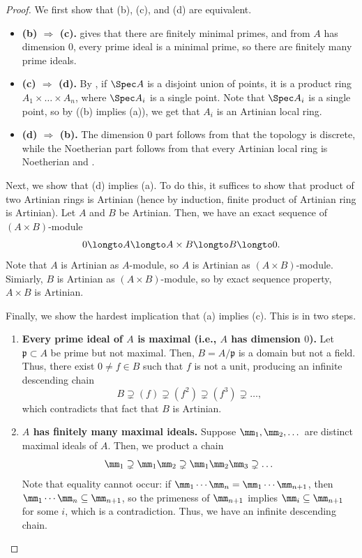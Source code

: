 \begin{proof}
We first show that (b), (c), and (d) are equivalent.
\begin{itemize}
\item \textbf{(b) $\Rightarrow$ (c).}  gives that 
there are finitely minimal primes,
and from $A$ has dimension $0$, 
every prime ideal is a minimal prime,
so there are finitely many prime ideals.
\item \textbf{(c) $\Rightarrow$ (d).} By
, if $\Spec A$
is a disjoint union of points, it is a product ring
$A_1\times\dots\times A_n$,
where $\Spec A_i$ is a single point. 
Note that $\Spec A_i$ is a single point, so by 
((b) implies (a)), we get that $A_i$ is an Artinian 
local ring.
\item \textbf{(d) $\Rightarrow$ (b).}
The dimension $0$ part follows from 
that the topology is discrete,
while the Noetherian part follows from 
 that every Artinian local ring 
is Noetherian and .
\end{itemize}

Next, we show that (d) implies (a).
To do this, it suffices to show that product
of two Artinian rings is Artinian
(hence by induction, finite product of Artinian ring 
is Artinian).
Let $A$ and $B$ be Artinian. Then, we have an exact
sequence of $(A\times B)$-module
$$0\longto A\longto A\times B\longto B\longto 0.$$
Note that $A$ is Artinian as
$A$-module, so $A$ is Artinian as $(A\times B)$-module.
Simiarly, $B$ is Artinian as $(A\times B)$-module,
so by exact sequence property, 
$A\times B$ is Artinian.

Finally, we show the hardest implication that (a) implies (c).
This is in two steps.
\begin{enumerate}
\item \textbf{Every prime ideal of $A$ is maximal
(i.e., $A$ has dimension $0$).}
Let $\mathfrak p\subset A$ be prime but not maximal.
Then, $B=A/\mathfrak p$ is a domain but not a field.
Thus, there exist $0\neq f\in B$
such that $f$ is not a unit,
producing an infinite descending chain
$$B\supsetneq (f)\supsetneq (f^2)\supsetneq (f^3)
\supsetneq \dots,$$
which contradicts that fact that $B$ is Artinian.
\item \textbf{$A$ has finitely many maximal ideals.}
Suppose $\mm_1,\mm_2,\dots$ are distinct maximal ideals of $A$.
Then, we product a chain 
$$\mm_1\supsetneq \mm_1\mm_2 \supsetneq \mm_1\mm_2\mm_3
\supsetneq\dots$$
Note that equality cannot occur:
if $\mm_1\cdots\mm_n = \mm_1\cdots\mm_{n+1}$,
then $\mm_1\cdots\mm_n\subseteq \mm_{n+1}$,
so the primeness of $\mm_{n+1}$ implies $\mm_i\subseteq\mm_{n+1}$
for some $i$, which is a contradiction.
Thus, we have an infinite descending chain.
\qedhere
\end{enumerate}
\end{proof}

